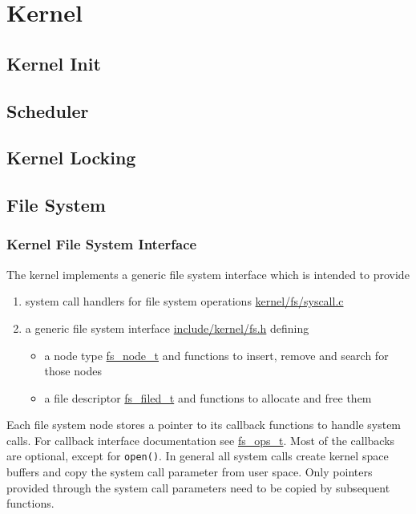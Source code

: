 \chapter{Kernel\label{chap:kernel}}
\section{Kernel Init}

\section{Scheduler}

\section{Kernel Locking}

\section{File System}
	\subsection{Kernel File System Interface}
		The kernel implements a generic file system interface which is intended to provide
		\begin{enumerate}
			\item system call handlers for file system operations \hyperref[kernel_2fs_2syscall_8c]{kernel/fs/syscall.c}
			\item a generic file system interface \hyperref[fs_8h]{include/kernel/fs.h} defining
				\begin{itemize}
					\item a node type \hyperref[structfs__node__t]{fs\_node\_t} and functions to insert, remove and search for those nodes
					\item a file descriptor \hyperref[structfs__filed__t]{fs\_filed\_t} and functions to allocate and free them
				\end{itemize}
		\end{enumerate}

		Each file system node stores a pointer to its callback functions to handle system calls. For callback interface documentation see \hyperref[structfs__ops__t]{fs\_ops\_t}. Most of the callbacks are optional, except for \lstinline{open()}.
		In general all system calls create kernel space buffers and copy the system call parameter from user space. Only pointers provided through the system call parameters need to be copied by subsequent functions.

